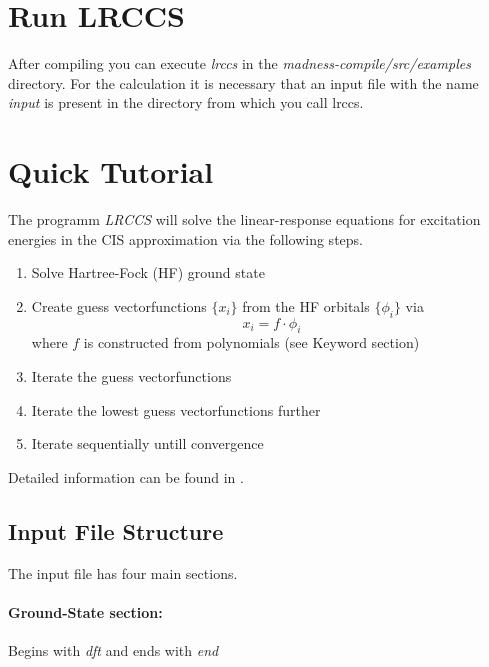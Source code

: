 \documentclass[10pt,a4paper]{scrartcl}
\begin{document}
\section{Run LRCCS}
After compiling you can execute \textit{lrccs} in the \textit{madness-compile/src/examples} directory. For the calculation it is necessary that an input file with the name \textit{input} is present in the directory from which you call lrccs.

\clearpage
\section{Quick Tutorial}
The programm \textit{LRCCS} \cite{mra-cis} will solve the linear-response equations for excitation energies in the CIS approximation via the following steps.
\begin{enumerate}
\item Solve Hartree-Fock (HF) ground state
\item Create guess vectorfunctions $\lbrace x_i \rbrace $ from the HF orbitals $\lbrace \phi_i \rbrace$ via
\[ x_i = f\cdot\phi_i \]
where $f$ is constructed from polynomials (see Keyword section)
\item Iterate the guess vectorfunctions 
\item Iterate the lowest guess vectorfunctions further
\item Iterate sequentially untill convergence
\end{enumerate}
Detailed information can be found in \cite{mra-cis}.
\subsection{Input File Structure}
The input file has four main sections.
\paragraph{Ground-State section:} Begins with \textit{dft} and ends with \textit{end}\\
\end{document}
